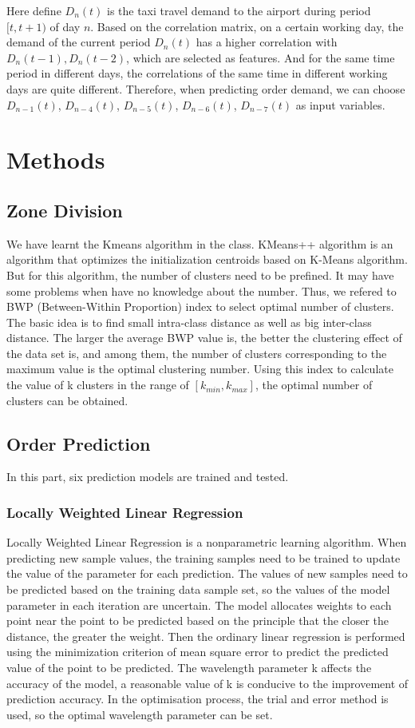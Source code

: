 \documentclass[sigconf]{acmart}
\begin{document}
Here define $D_{n}(t)$ is the taxi travel demand to the airport during period $[t, t+1)$ of day $n$.
Based on the correlation matrix, on a certain working day, the demand of the current period $D_{n}(t)$ has a higher correlation with $D_{n}(t-1), D_{n}(t-2)$, which are selected as features. 
And for the same time period in different days, the correlations of the same time in different working days are quite different. Therefore, when predicting order demand, we can choose $D_{n-1}(t)$, $D_{n-4}(t)$, $D_{n-5}(t)$, $D_{n-6}(t)$, $D_{n-7}(t)$ as input variables.

\section{Methods}
\subsection{Zone Division}
We have learnt the K\-means algorithm in the class. K\-Means++ algorithm is an algorithm that optimizes the initialization centroids based on K-Means algorithm. 
But for this algorithm, the number of clusters need to be prefined. It may have some problems when have no
knowledge about the number. 
Thus, we refered to BWP (Between-Within Proportion) index to select optimal number of clusters.
The basic idea is to find small intra-class distance as well as big inter-class distance.
The larger the average BWP value is, the better the clustering effect of the data set is, and among them, the number of clusters corresponding to the maximum value is the optimal clustering number.
Using this index to calculate the value of k clusters in the range of $[k_{min},k_{max}]$, the optimal number of clusters can be obtained.

\subsection{Order Prediction}
In this part, six prediction models are trained and tested.
  \subsubsection{Locally Weighted Linear Regression}
  Locally Weighted Linear Regression is a nonparametric learning algorithm\cite{cleveland1979robust}.
  When predicting new sample values, the training samples need to be trained to update the value of the parameter for each prediction.
  The values of new samples need to be predicted based on the training data sample set, so the values of the model parameter in each iteration are uncertain.
  The model allocates weights to each point near the point to be predicted based on the principle that the closer the distance, the greater the weight.
  Then the ordinary linear regression is performed using the minimization criterion of mean square error to predict the predicted value of the point to be predicted. The wavelength parameter k affects the accuracy of the model, a reasonable value of k is conducive to the improvement of prediction accuracy. In the optimisation process, the trial and error method is used, so the optimal wavelength parameter can be set.
\end{document}
